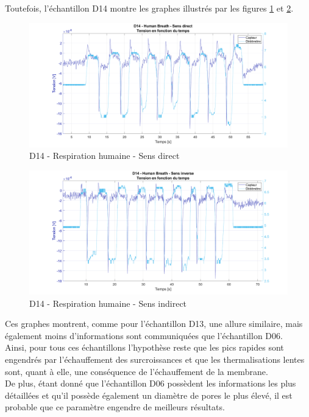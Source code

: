 Toutefois, l'échantillon D14 montre les graphes illustrés par les figures \ref{fig:d14_hb_direct} et \ref{fig:d14_hb_indirect}. 


\begin{figure}[H]
    \hspace{-1cm}
    \includegraphics[scale = 0.35]{assets/figures/D14_hb_sensDirect.png}
    \caption{D14 - Respiration humaine - Sens direct}
    \label{fig:d14_hb_direct}
\end{figure}

\begin{figure}[H]
    \hspace{-1cm}
    \includegraphics[scale=0.35]{assets/figures/D14_hb_sensIndirect.png}
    \caption{D14 - Respiration humaine - Sens indirect}
    \label{fig:d14_hb_indirect}
\end{figure}


Ces graphes montrent, comme pour l'échantillon D13, une allure similaire, mais également moins d'informations sont communiquées que l'échantillon D06. \\

Ainsi, pour tous ces échantillons l'hypothèse reste que les pics rapides sont engendrés par l'échauffement des surcroissances et que les thermalisations 
lentes sont, quant à elle, une conséquence de l'échauffement de la membrane. \\
De plus, étant donné que l'échantillon D06 possèdent les informations les plus détaillées et qu'il possède également un diamètre de pores le plus élevé, il est probable 
que ce paramètre engendre de meilleurs résultats. 

